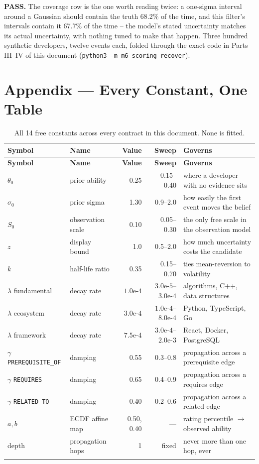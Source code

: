 \documentclass[10pt,a4paper]{article}
\begin{document}
\textbf{PASS.} The coverage row is the one worth reading twice: a one-sigma
interval around a Gaussian should contain the truth 68.2\% of the time, and
this filter's intervals contain it 67.7\% of the time -- the model's stated
uncertainty matches its actual uncertainty, with nothing tuned to make that
happen. Three hundred synthetic developers, twelve events each, folded
through the exact code in Parts III--IV of this document
(\texttt{python3 -m m6\_scoring recover}).

\section{Appendix --- Every Constant, One Table}

\begin{longtable}{@{}lL{2.7cm}rrL{4.3cm}@{}}
\toprule
\textbf{Symbol} & \textbf{Name} & \textbf{Value} & \textbf{Sweep} & \textbf{Governs} \\
\midrule
\endfirsthead
\toprule
\textbf{Symbol} & \textbf{Name} & \textbf{Value} & \textbf{Sweep} & \textbf{Governs} \\
\midrule
\endhead
$\theta_0$ & prior ability     & 0.25 & 0.15--0.40 & where a developer with no evidence sits \\
$\sigma_0$ & prior sigma       & 1.30 & 0.9--2.0   & how easily the first event moves the belief \\
$S_0$      & observation scale & 0.10 & 0.05--0.30 & the only free scale in the observation model \\
$z$        & display bound     & 1.0  & 0.5--2.0   & how much uncertainty costs the candidate \\
$k$        & half-life ratio   & 0.35 & 0.15--0.70 & ties mean-reversion to volatility \\
$\lambda$ fundamental & decay rate & $1.0\text{e-}4$ & $3.0\text{e-}5$--$3.0\text{e-}4$ & algorithms, C++, data structures \\
$\lambda$ ecosystem   & decay rate & $3.0\text{e-}4$ & $1.0\text{e-}4$--$8.0\text{e-}4$ & Python, TypeScript, Go \\
$\lambda$ framework   & decay rate & $7.5\text{e-}4$ & $3.0\text{e-}4$--$2.0\text{e-}3$ & React, Docker, PostgreSQL \\
$\gamma$ \texttt{PREREQUISITE\_OF} & damping & 0.55 & 0.3--0.8 & propagation across a prerequisite edge \\
$\gamma$ \texttt{REQUIRES}         & damping & 0.65 & 0.4--0.9 & propagation across a requires edge \\
$\gamma$ \texttt{RELATED\_TO}      & damping & 0.40 & 0.2--0.6 & propagation across a related edge \\
$a,b$      & ECDF affine map   & 0.50, 0.40 & --- & rating percentile $\to$ observed ability \\
depth      & propagation hops  & 1    & fixed      & never more than one hop, ever \\
\bottomrule
\caption{All 14 free constants across every contract in this document. None is fitted.}
\end{longtable}
\end{document}
